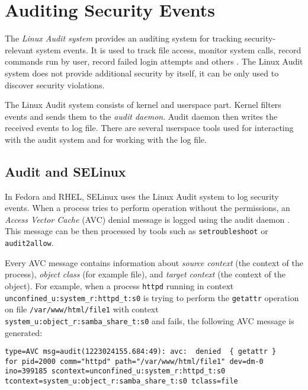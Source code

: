 \section{Auditing Security Events}

The \emph{Linux Audit system} provides an auditing system for tracking
security-relevant system events. It is used to track file access, monitor system
calls, record commands run by user, record failed login attempts and others
\cite{secguide}. The Linux Audit system does not provide additional security by
itself, it can be only used to discover security violations.

The Linux Audit system consists of kernel and userspace part. Kernel filters
events and sends them to the \emph{audit daemon}. Audit daemon then writes the
received events to log file. There are several userspace tools used for
interacting with the audit system and for working with the log file.

\subsection{Audit and SELinux}

In Fedora and RHEL, SELinux uses the Linux Audit system to log security events.
When a process tries to perform operation without the permissions, an
\emph{Access Vector Cache} (AVC) denial message is logged using the audit daemon
\cite{selinuxguide}. This message can be then processed by tools such as
\texttt{setroubleshoot} or \texttt{audit2allow}.

Every AVC message contains information about \emph{source context} (the context
of the process), \emph{object class} (for example file), and \emph{target
context} (the context of the object). For example, when a process \texttt{httpd}
running in context \texttt{unconfined\_u:system\_r:httpd\_t:s0} is trying to
perform the \texttt{getattr} operation on file \texttt{/var/www/html/file1} with
context \texttt{system\_u:object\_r:samba\_share\_t:s0} and fails, the following
AVC message is generated:

\begin{lstlisting}
type=AVC msg=audit(1223024155.684:49): avc:  denied  { getattr }
for pid=2000 comm="httpd" path="/var/www/html/file1" dev=dm-0
ino=399185 scontext=unconfined_u:system_r:httpd_t:s0
tcontext=system_u:object_r:samba_share_t:s0 tclass=file
\end{lstlisting}

